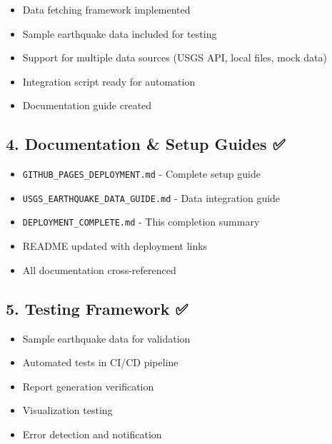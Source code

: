 \documentclass[
  11pt,
  oneside,
  openany]{scrbook}
\providecommand{\tightlist}{%
  \setlength{\itemsep}{0pt}\setlength{\parskip}{0pt}}\usepackage{longtable,booktabs,array}
\begin{document}
\begin{itemize}
\tightlist
\item[$\boxtimes$]
  Data fetching framework implemented
\item[$\boxtimes$]
  Sample earthquake data included for testing
\item[$\boxtimes$]
  Support for multiple data sources (USGS API, local files, mock data)
\item[$\boxtimes$]
  Integration script ready for automation
\item[$\boxtimes$]
  Documentation guide created
\end{itemize}

\subsection{\texorpdfstring{4. \textbf{Documentation \& Setup Guides}
✅}{4. Documentation \& Setup Guides ✅}}\label{documentation-setup-guides}

\begin{itemize}
\tightlist
\item[$\boxtimes$]
  \texttt{GITHUB\_PAGES\_DEPLOYMENT.md} - Complete setup guide
\item[$\boxtimes$]
  \texttt{USGS\_EARTHQUAKE\_DATA\_GUIDE.md} - Data integration guide
\item[$\boxtimes$]
  \texttt{DEPLOYMENT\_COMPLETE.md} - This completion summary
\item[$\boxtimes$]
  README updated with deployment links
\item[$\boxtimes$]
  All documentation cross-referenced
\end{itemize}

\subsection{\texorpdfstring{5. \textbf{Testing Framework}
✅}{5. Testing Framework ✅}}\label{testing-framework}

\begin{itemize}
\tightlist
\item[$\boxtimes$]
  Sample earthquake data for validation
\item[$\boxtimes$]
  Automated tests in CI/CD pipeline
\item[$\boxtimes$]
  Report generation verification
\item[$\boxtimes$]
  Visualization testing
\item[$\boxtimes$]
  Error detection and notification
\end{itemize}
\end{document}
